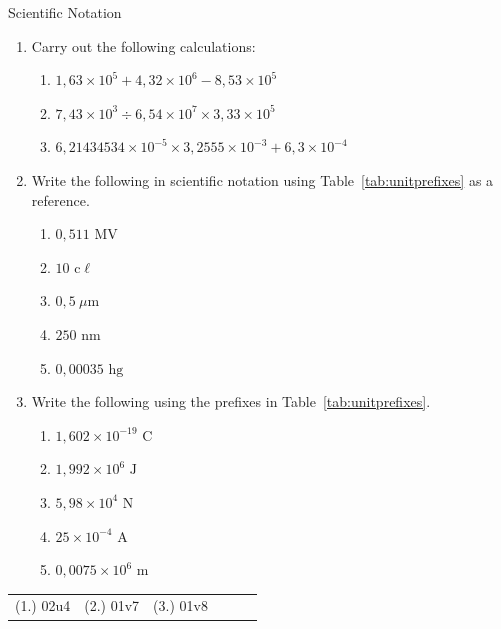 \begin{exercises}{Scientific Notation }
            \nopagebreak \noindent
\begin{enumerate}[noitemsep, label=\textbf{\arabic*}. ] 
 \item Carry out the following calculations:
    \begin{enumerate}[noitemsep, label=\textbf{\alph*}. ] 
     \item $1,63 \times 10^{5} + 4,32 \times 10^{6} - 8,53 \times 10^{5}$
     \item $7,43 \times 10^{3} \div 6,54 \times 10^{7} \times 3,33 \times 10^{5}$
     \item $6,21434534 \times 10^{-5} \times 3,2555 \times 10^{-3} + 6,3 \times 10^{-4}$
    \end{enumerate}
  \item Write the following in scientific notation using Table~\ref{tab:unitprefixes} as a reference.
    \begin{enumerate}[noitemsep, label=\textbf{\alph*}. ] 
      \item $0,511 \text{ MV}$
      \item $10 \text{ c}\ell $
      \item $0,5 ~\mu\text{m}$
      \item $250 \text{ nm}$
      \item $0,00035 \text{ hg}$
    \end{enumerate}
  \item Write the following using the prefixes in Table~\ref{tab:unitprefixes}.
    \begin{enumerate}[noitemsep, label=\textbf{\alph*}. ] 
      \item $1,602 \times{10}^{-19} \text{ C}$
      \item $1,992 \times{10}^{6} \text { J}$
      \item $5,98 \times{10}^{4} \text{ N}$
      \item $25 \times{10}^{-4} \text{ A}$
      \item $0,0075 \times{10}^{6} \text{ m}$
    \end{enumerate}
\end{enumerate}
\par \practiceinfo
 \par \begin{tabular}[h]{cccccc}
(1.) 02u4 & (2.) 01v7  &  (3.) 01v8  & \end{tabular}
\end{exercises}
